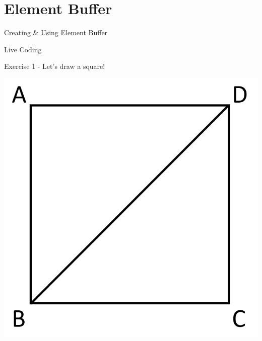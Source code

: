 \part{Element Buffer}
\frame{\partpage}

\begin{frame}{Creating \& Using Element Buffer}
	\begin{center}
		Live Coding
	\end{center}
\end{frame}

\begin{frame}{Exercise 1 - Let's draw a square!}
\begin{center}
	\includegraphics[height=0.8\textheight]{square_vertices}
\end{center}
\end{frame}

